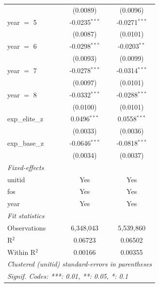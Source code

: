 \begin{tabular}{lcc}
                   & (0.0089)        & (0.0096)\\   
   year $=$ 5      & -0.0235$^{***}$ & -0.0271$^{***}$\\   
                   & (0.0087)        & (0.0101)\\   
   year $=$ 6      & -0.0298$^{***}$ & -0.0203$^{**}$\\   
                   & (0.0093)        & (0.0099)\\   
   year $=$ 7      & -0.0278$^{***}$ & -0.0314$^{***}$\\   
                   & (0.0097)        & (0.0101)\\   
   year $=$ 8      & -0.0332$^{***}$ & -0.0288$^{***}$\\   
                   & (0.0100)        & (0.0101)\\   
   exp\_elite\_z   & 0.0496$^{***}$  & 0.0558$^{***}$\\   
                   & (0.0033)        & (0.0036)\\   
   exp\_base\_z    & -0.0646$^{***}$ & -0.0818$^{***}$\\   
                   & (0.0034)        & (0.0037)\\   
   \midrule
   \emph{Fixed-effects}\\
   unitid          & Yes             & Yes\\  
   fos             & Yes             & Yes\\  
   year            & Yes             & Yes\\  
   \midrule
   \emph{Fit statistics}\\
   Observations    & 6,348,043       & 5,539,860\\  
   R$^2$           & 0.06723         & 0.06502\\  
   Within R$^2$    & 0.00166         & 0.00355\\  
   \midrule \midrule
   \multicolumn{3}{l}{\emph{Clustered (unitid) standard-errors in parentheses}}\\
   \multicolumn{3}{l}{\emph{Signif. Codes: ***: 0.01, **: 0.05, *: 0.1}}\\
\end{tabular}
\par\endgroup


